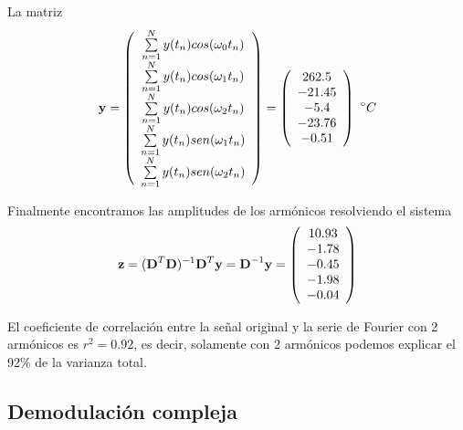 \documentclass[
]{agujournal2019}
\begin{document}
La matriz \[{\textbf y}=\left( \begin{array}{ccc}
\sum\limits^N_{n=1}y(t_n)cos(\omega_0 t_n) \\
\sum\limits^N_{n=1}y(t_n)cos(\omega_1 t_n) \\
\sum\limits^N_{n=1}y(t_n)cos(\omega_2 t_n) \\
\sum\limits^N_{n=1}y(t_n)sen(\omega_1 t_n) \\
\sum\limits^N_{n=1}y(t_n)sen(\omega_2 t_n) \\
\end{array} \right)=
\left( \begin{array}{ccc}
262.5 \\
-21.45 \\
-5.4 \\
-23.76 \\
-0.51 \\
\end{array} \right)\,\,^\circ{C}\]

Finalmente encontramos las amplitudes de los armónicos resolviendo el
sistema
\[{\textbf z}=({\textbf D}^T{\textbf D})^{-1}{\textbf D}^{T}{\textbf y}={\textbf D}^{-1}{\textbf y}=\left( \begin{array}{ccc}
10.93\\
-1.78\\
-0.45\\
-1.98\\
-0.04
\end{array} \right)\]

El coeficiente de correlación entre la señal original y la serie de
Fourier con 2 armónicos es \(r^2=0.92\), es decir, solamente con 2
armónicos podemos explicar el 92\% de la varianza total.

\hypertarget{demodulaciuxf3n-compleja}{%
\subsection{Demodulación compleja}\label{demodulaciuxf3n-compleja}}
\end{document}
